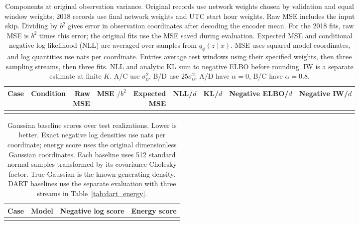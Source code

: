 \documentclass{article}
\begin{document}
\clearpage
\begin{table}[H]
\centering
\setlength{\tabcolsep}{1.8pt}
\caption{Components at original observation variance. Original records use network weights chosen by validation and equal window weights; 2018 records use final network weights and UTC start hour weights. Raw MSE includes the input skip. Dividing by $b^2$ gives error in observation coordinates after decoding the encoder mean. For the 2018 fits, raw MSE is $b^2$ times this error; the original fits use the MSE saved during evaluation. Expected MSE and conditional negative log likelihood (NLL) are averaged over samples from $q_\phi(z\mid x)$. MSE uses squared model coordinates, and log quantities use nats per coordinate. Entries average test windows using their specified weights, then three sampling streams, then three fits. NLL and analytic KL sum to negative ELBO before rounding. IW is a separate estimate at finite $K$. A/C use $\sigma_0^2$, B/D use $25\sigma_0^2$; A/D have $\alpha=0$, B/C have $\alpha=0.8$.}
\label{tab:components}
\begin{tabular}{llrrrrrrr}
\toprule
Case & Condition & \shortstack{Raw\\MSE} & \shortstack{MSE\\$ / b^2$} & \shortstack{Expected\\MSE} & NLL/$d$ & KL/$d$ & \shortstack{Negative\\ELBO/$d$} & \shortstack{Negative\\IW/$d$}\\
\midrule
\\
\bottomrule
\end{tabular}
\end{table}

\begin{table}[H]
\centering
\caption{Gaussian baseline scores over test realizations. Lower is better. Exact negative log densities use nats per coordinate; energy score uses the original dimensionless Gaussian coordinates. Each baseline uses 512 standard normal samples transformed by its covariance Cholesky factor. True Gaussian is the known generating density. DART baselines use the separate evaluation with three streams in Table~\ref{tab:dart_energy}.}
\begin{tabular}{llrr}
\toprule
Case & Model & Negative log score & Energy score\\
\midrule
\\
\bottomrule
\end{tabular}
\end{table}
\end{document}
